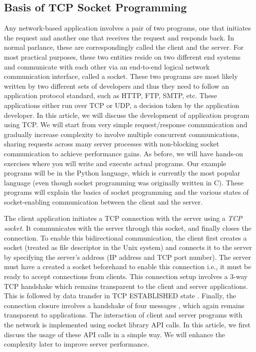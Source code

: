 \begin{multicols}{2}
\section{Basis of TCP Socket Programming}

Any network-based application involves a pair of two programs, one that initiates the request and another one that receives the request and responds back. In normal parlance, these are correspondingly called the client and the server. For most practical purposes, these two entities reside on two different end systems and communicate with each other via an end-to-end logical network communication interface, called a socket. These two programs are most likely written by two different sets of developers and thus they need to follow an application protocol standard, such as HTTP, FTP, SMTP, etc.  These applications either run over TCP or UDP, a decision taken by the application developer. In this article, we will discuss the development of application program using TCP. We will start from very simple request/response communication and gradually increase complexity to involve multiple concurrent communications, sharing requests across many server processes with non-blocking socket communication to achieve performance gains. As before, we will have hands-on exercises where you will write and execute actual programs. Our example programs will be in the Python language, which is currently the most popular language (even though socket programming was originally written in C). These programs will explain the basics of socket programming and the various states of socket-enabling communication between the client and the server.

The client application initiates a TCP connection with the server using a \textit{TCP socket}. It communicates with the server through this socket, and finally closes the connection. To enable this bidirectional communication, the client first creates a socket (treated as file descriptor in the Unix system) and connects it to the server by specifying the server’s address (IP address and TCP port number). The server must have a created a socket beforehand to enable this connection i.e., it must be ready to accept connections from clients. This connection setup involves a 3-way TCP handshake \cite{art1-key09}\cite{art1-key10}\cite{art1-key11} which remains transparent to the client and server applications. This is followed by data transfer in TCP ESTABLISHED state \cite{art1-key11}. Finally, the connection closure involves a handshake of four messages \cite{art1-key12}, which again remains transparent to applications. The interaction of client and server programs with the network is implemented using socket library API calls. In this article, we first discuss the usage of these API calls in a simple way. We will enhance the complexity later to improve server performance.


\end{multicols}
